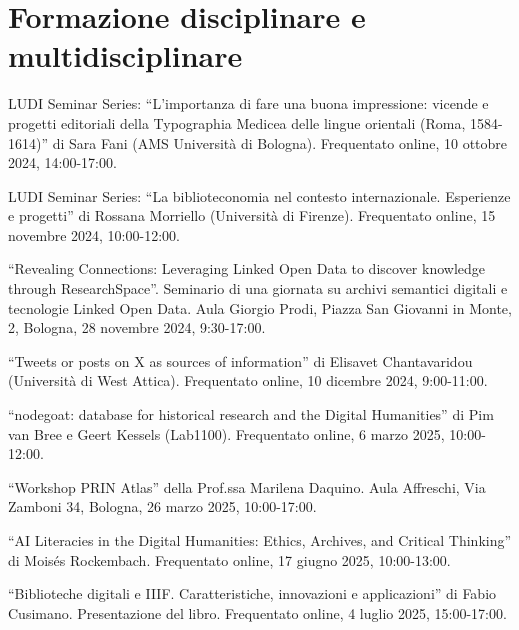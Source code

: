 \section{Formazione disciplinare e multidisciplinare}

LUDI Seminar Series: ``L'importanza di fare una buona impressione: vicende e progetti editoriali della Typographia Medicea delle lingue orientali (Roma, 1584-1614)'' di Sara Fani (AMS Università di Bologna). Frequentato online, 10 ottobre 2024, 14:00-17:00.

LUDI Seminar Series: ``La biblioteconomia nel contesto internazionale. Esperienze e progetti'' di Rossana Morriello (Università di Firenze). Frequentato online, 15 novembre 2024, 10:00-12:00.

``Revealing Connections: Leveraging Linked Open Data to discover knowledge through ResearchSpace''. Seminario di una giornata su archivi semantici digitali e tecnologie Linked Open Data. Aula Giorgio Prodi, Piazza San Giovanni in Monte, 2, Bologna, 28 novembre 2024, 9:30-17:00.

``Tweets or posts on X as sources of information'' di Elisavet Chantavaridou (Università di West Attica). Frequentato online, 10 dicembre 2024, 9:00-11:00.

``nodegoat: database for historical research and the Digital Humanities'' di Pim van Bree e Geert Kessels (Lab1100). Frequentato online, 6 marzo 2025, 10:00-12:00.

``Workshop PRIN Atlas'' della Prof.ssa Marilena Daquino. Aula Affreschi, Via Zamboni 34, Bologna, 26 marzo 2025, 10:00-17:00.

``AI Literacies in the Digital Humanities: Ethics, Archives, and Critical Thinking'' di Moisés Rockembach. Frequentato online, 17 giugno 2025, 10:00-13:00.

``Biblioteche digitali e IIIF. Caratteristiche, innovazioni e applicazioni'' di Fabio Cusimano. Presentazione del libro. Frequentato online, 4 luglio 2025, 15:00-17:00.